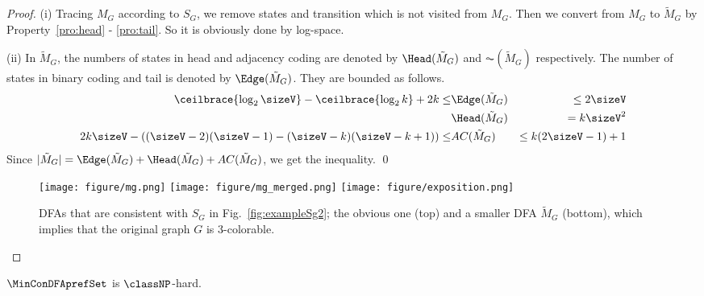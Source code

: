 \begin{proof}
 (i) Tracing $M_G$ according to $S_G$, we remove states and transition which is not visited from $M_G$.
 Then we convert from $M_G$ to $\tilde{M}_G$ by Property~\ref{pro:head} - \ref{pro:tail}.
 So it is obviously done by log-space.
 
 (ii) In $\tilde{M}_G$, the numbers of states in head and adjacency coding are denoted by $\Head(\tilde{M}_G)$ and $\AC(\tilde{M}_G)$ respectively.
 The number of states in binary coding and tail is denoted by $\Edge(\tilde{M}_G)$.
 They are bounded as follows.
 \begin{eqnarray*}
  \ceilbrace{\log_2{\sizeV}} - \ceilbrace{\log_2{k}} + 2k \leq & \Edge(\tilde{M}_G) & \leq 2\sizeV \\
  & \Head(\tilde{M}_G) & = k\sizeV^2 \\
  2k\sizeV - \left((\sizeV-2)(\sizeV-1) - (\sizeV-k)(\sizeV-k+1)\right) \leq & AC(\tilde{M}_G) & \leq k(2\sizeV-1) + 1
 \end{eqnarray*}
 Since $|\tilde{M}_G| = \Edge(\tilde{M}_G) + \Head(\tilde{M}_G) + AC(\tilde{M}_G)$, 
 we get the inequality. \qed
 \begin{figure}[tb]
  \begin{center}
   \texttt{[image: figure/mg.png]}
   \texttt{[image: figure/mg\_merged.png]}
   \texttt{[image: figure/exposition.png]}
  \end{center}
  \caption{DFAs that are consistent with $S_G$ in Fig.~\ref{fig:exampleSg2};
  the obvious one (top) and a smaller DFA $\tilde{M}_G$ (bottom),
  which implies that the original graph $G$ is $3$-colorable.}
  \label{fig:minimizeDFA}
 \end{figure}
\end{proof}
% 
% 
\begin{theorem}\label{theorem:intractability}
	$\MinConDFAprefSet$ is $\classNP$-hard.
\end{theorem}
